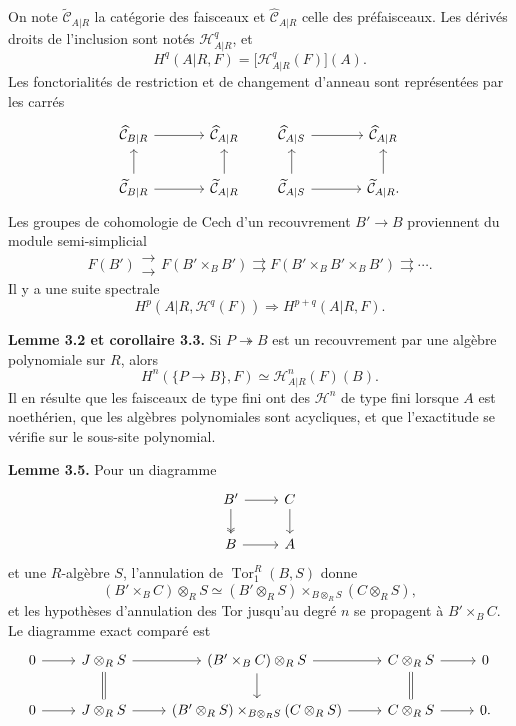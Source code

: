 \documentclass[11pt]{article}
\providecommand{\Tor}{\operatorname{Tor}}
\providecommand{\cC}{\mathcal C}
\providecommand{\cH}{\mathcal H}
\begin{document}
On note \(\widetilde{\cC}_{A|R}\) la catégorie des faisceaux et \(\widehat{\cC}_{A|R}\) celle des préfaisceaux.  Les dérivés droits de l'inclusion sont notés \(\cH^q_{A|R}\), et
\[
H^q(A|R,F)=\bigl[\cH^q_{A|R}(F)\bigr](A).
\]
Les fonctorialités de restriction et de changement d'anneau sont représentées par les carrés
\[
\begin{tikzcd}[column sep=large]
\widehat{\cC}_{B|R} \arrow[r] & \widehat{\cC}_{A|R} \\
\widetilde{\cC}_{B|R} \arrow[u] \arrow[r] & \widetilde{\cC}_{A|R} \arrow[u]
\end{tikzcd}
\qquad
\begin{tikzcd}[column sep=large]
\widehat{\cC}_{A|S} \arrow[r] & \widehat{\cC}_{A|R} \\
\widetilde{\cC}_{A|S} \arrow[u] \arrow[r] & \widetilde{\cC}_{A|R} \arrow[u].
\end{tikzcd}
\]
Les groupes de cohomologie de Cech d'un recouvrement \(B'\to B\) proviennent du module semi-simplicial
\[
F(B')\mathrel{\substack{\longrightarrow\\[-.6ex]\longrightarrow}} F(B'\times_BB')\rightrightarrows F(B'\times_BB'\times_BB')\rightrightarrows\cdots .
\]
Il y a une suite spectrale
\[
H^p(A|R,\cH^q(F))\Rightarrow H^{p+q}(A|R,F).
\]

\textbf{Lemme 3.2 et corollaire 3.3.}  Si \(P\twoheadrightarrow B\) est un recouvrement par une algèbre polynomiale sur \(R\), alors
\[
H^n(\{P\to B\},F)\simeq\cH^n_{A|R}(F)(B).
\]
Il en résulte que les faisceaux de type fini ont des \(\cH^n\) de type fini lorsque \(A\) est noethérien, que les algèbres polynomiales sont acycliques, et que l'exactitude se vérifie sur le sous-site polynomial.

\textbf{Lemme 3.5.}  Pour un diagramme
\[
\begin{tikzcd}
B' \arrow[r] \arrow[d,two heads] & C \arrow[d] \\
B \arrow[r] & A
\end{tikzcd}
\]
et une \(R\)-algèbre \(S\), l'annulation de \(\Tor^R_1(B,S)\) donne
\[
(B'\times_BC)\otimes_RS\simeq(B'\otimes_RS)\times_{B\otimes_RS}(C\otimes_RS),
\]
et les hypothèses d'annulation des Tor jusqu'au degré \(n\) se propagent à \(B'\times_BC\).  Le diagramme exact comparé est
\[
\begin{tikzcd}
0\arrow[r]&J\otimes_RS\arrow[r]\arrow[d,equal]&(B'\times_BC)\otimes_RS\arrow[r]\arrow[d]&C\otimes_RS\arrow[r]\arrow[d,equal]&0\\
0\arrow[r]&J\otimes_RS\arrow[r]&(B'\otimes_RS)\times_{B\otimes_RS}(C\otimes_RS)\arrow[r]&C\otimes_RS\arrow[r]&0.
\end{tikzcd}
\]
\end{document}
